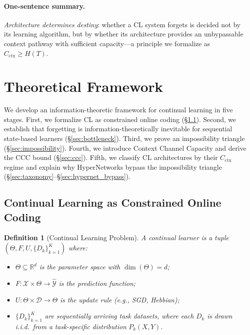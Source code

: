 \documentclass{article}
\newtheorem{definition}{Definition}
\begin{document}
\paragraph{One-sentence summary.} \emph{Architecture determines destiny}: whether a CL system forgets is decided not by its learning algorithm, but by whether its architecture provides an unbypassable context pathway with sufficient capacity---a principle we formalize as $C_\mathrm{ctx} \geq H(T)$.


\section{Theoretical Framework}
\label{sec:theory}

We develop an information-theoretic framework for continual learning in five stages. First, we formalize CL as constrained online coding (\S\ref{sec:cl_coding}). Second, we establish that forgetting is information-theoretically inevitable for sequential state-based learners (\S\ref{sec:bottleneck}). Third, we prove an impossibility triangle (\S\ref{sec:impossibility}). Fourth, we introduce Context Channel Capacity and derive the CCC bound (\S\ref{sec:ccc}). Fifth, we classify CL architectures by their $C_\mathrm{ctx}$ regime and explain why HyperNetworks bypass the impossibility triangle (\S\ref{sec:taxonomy}--\S\ref{sec:hypernet_bypass}).


\subsection{Continual Learning as Constrained Online Coding}
\label{sec:cl_coding}

\begin{definition}[Continual Learning Problem]
\label{def:cl}
A \emph{continual learner} is a tuple $(\Theta, F, U, \{D_k\}_{k=1}^K)$ where:
\begin{itemize}
    \item $\Theta \subseteq \mathbb{R}^d$ is the parameter space with $\dim(\Theta) = d$;
    \item $F: \mathcal{X} \times \Theta \to \hat{\mathcal{Y}}$ is the prediction function;
    \item $U: \Theta \times \mathcal{D} \to \Theta$ is the update rule (e.g., SGD, Hebbian);
    \item $\{D_k\}_{k=1}^K$ are sequentially arriving task datasets, where each $D_k$ is drawn i.i.d.\ from a task-specific distribution $P_k(X,Y)$.
\end{itemize}
\end{definition}
\end{document}
